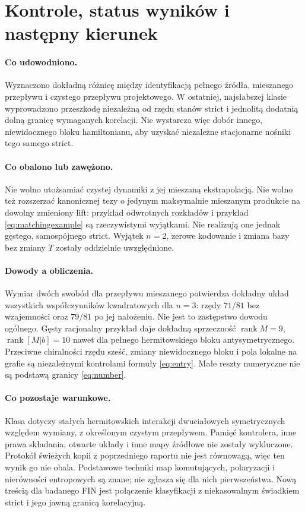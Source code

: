\documentclass[11pt,a4paper]{article}
\begin{document}
\section{Kontrole, status wyników i następny kierunek}

\paragraph{Co udowodniono.}
Wyznaczono dokładną różnicę między identyfikacją pełnego źródła,
mieszanego przepływu i czystego przepływu projektowego. W ostatniej,
najsłabszej klasie wyprowadzono przeszkodę niezależną od rzędu stanów
strict i jednolitą dodatnią dolną granicę wymaganych korelacji.
Nie wystarcza więc dobór innego, niewidocznego bloku hamiltonianu,
aby uzyskać niezależne stacjonarne nośniki tego samego strict.

\paragraph{Co obalono lub zawężono.}
Nie wolno utożsamiać czystej dynamiki z jej mieszaną ekstrapolacją.
Nie wolno też rozszerzać kanonicznej tezy o jedynym maksymalnie
mieszanym produkcie na dowolny zmieniony lift: przykład odwrotnych
rozkładów i przykład \eqref{eq:matchingexample} są rzeczywistymi wyjątkami.
Nie realizują one jednak gęstego, samospójnego strict.
Wyjątek $n=2$, zerowe kodowanie i zmiana bazy bez zmiany $T$ zostały
oddzielnie uwzględnione.

\paragraph{Dowody a obliczenia.}
Wymiar dwóch swobód dla przepływu mieszanego potwierdza dokładny
układ wszystkich współczynników kwadratowych dla $n=3$: rzędy
$71/81$ bez wzajemności oraz $79/81$ po jej nałożeniu.
Nie jest to zastępstwo dowodu ogólnego. Gęsty racjonalny przykład
daje dokładną sprzeczność $\operatorname{rank}M=9$,
$\operatorname{rank}[M|b]=10$ nawet dla pełnego hermitowskiego
bloku antysymetrycznego. Przeciwne chiralności rzędu sześć,
zmiany niewidocznego bloku i pola lokalne na grafie są niezależnymi
kontrolami formuły \eqref{eq:entry}. Małe reszty numeryczne nie są
podstawą granicy \eqref{eq:number}.

\paragraph{Co pozostaje warunkowe.}
Klasa dotyczy stałych hermitowskich interakcji dwuciałowych
symetrycznych względem wymiany, z określonym czystym przepływem.
Pamięć kontrolera, inne prawa składania, otwarte układy i inne
mapy źródłowe nie zostały wykluczone. Protokół świeżych kopii
z poprzedniego raportu nie jest równowagą, więc ten wynik go nie obala.
Podstawowe techniki map komutujących, polaryzacji i nierówności
entropowych są znane; nie zgłasza się dla nich pierwszeństwa.
Nową treścią dla badanego FIN jest połączenie klasyfikacji z
niekasowalnym świadkiem strict i jego jawną granicą korelacyjną.
\end{document}
